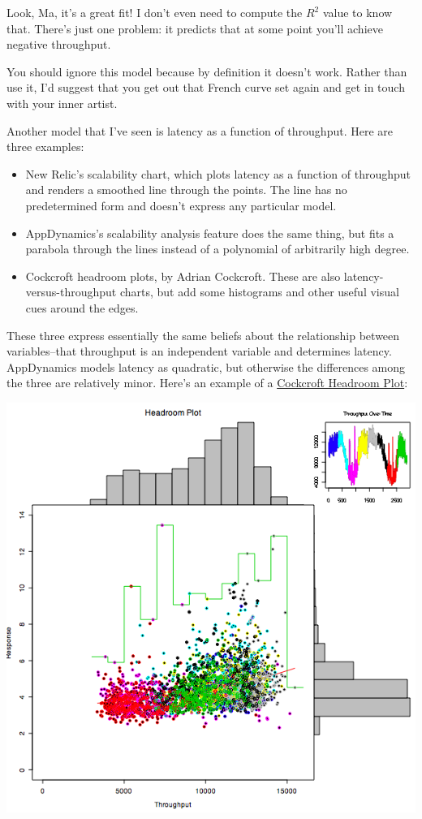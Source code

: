 \documentclass{vivid_layout}
\begin{document}
Look, Ma, it's a great fit! I don't even need to compute the $R^2$ value to know
that. There's just one problem: it predicts that at some point you'll achieve
negative throughput.

You should ignore this model because by definition it doesn't work. Rather than
use it, I'd suggest that you get out that French curve set again and get in
touch with your inner artist.

Another model that I've seen is latency as a function of throughput. Here
are three examples:

\begin{itemize}
\item New Relic's scalability chart, which plots latency as a function of
throughput and renders a smoothed line through the points. The line has no
predetermined form and doesn't express any particular model.
\item AppDynamics's scalability analysis feature does the same thing, but fits a
parabola through the lines instead of a polynomial of arbitrarily high degree.
\item Cockcroft headroom plots, by Adrian Cockcroft. These are also
latency-versus-throughput charts, but add some histograms and other useful
visual cues around the edges.
\end{itemize}

These three express essentially the same beliefs about the relationship between
variables--that throughput is an independent variable and determines latency.
AppDynamics models latency as quadratic, but otherwise
the differences among the three are relatively minor. Here's an example of a
\href{http://perfcap.blogspot.nl/2008/07/enhanced-headroom-plot-in-r.html}{Cockcroft
Headroom Plot}:
\begin{center}
\includegraphics[width=.60\linewidth]{scalability/chpblog3}
\end{center}
\end{document}
